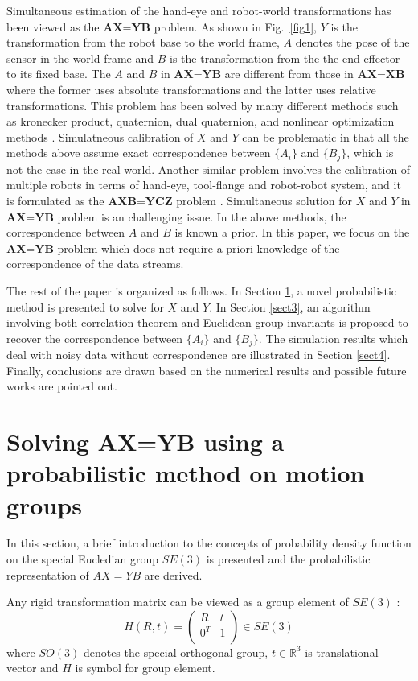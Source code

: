 \documentclass[letterpaper, 10 pt, conference]{ieeeconf}  %
\begin{document}
Simultaneous estimation of the hand-eye and robot-world transformations has been viewed as the $\textbf{AX=YB}$ problem. As shown in Fig.~\ref{fig1}, $Y$ is the transformation from the robot base to the world frame, $A$ denotes the pose of the sensor in the world frame and $B$ is the transformation from the the end-effector to its fixed base. The $A$ and $B$ in $\textbf{AX=YB}$ are different from those in $\textbf{AX=XB}$ where the former uses absolute transformations and the latter uses relative transformations. This problem has been solved by many different methods such as kronecker product, quaternion, dual quaternion, and nonlinear optimization methods \cite{Zhuang1994,dornaika1998simultaneous,Hirsh2001, ernst2012non,strobl2006optimal,Li2010,Shah2013,Heller2014}. Simulatneous calibration of $X$ and $Y$ can be problematic in that all the methods above assume exact correspondence between $\{A_i\}$ and $\{B_j\}$, which is not the case in the real world. Another similar problem involves the calibration of multiple robots in terms of hand-eye, tool-flange and robot-robot system, and it is formulated as the $\textbf{AXB=YCZ}$ problem \cite{Wang2014}. Simultaneous solution for $X$ and $Y$ in $\textbf{AX=YB}$ problem is an challenging issue. In the above methods, the correspondence between $A$ and $B$ is known a prior. In this paper, we focus on the $\textbf{AX=YB}$ problem which does not require a priori knowledge of the correspondence of the data streams.

The rest of the paper is organized as follows. In Section
\ref{sect2}, a novel probabilistic method is presented to solve for $X$ and $Y$. In Section \ref{sect3}, an algorithm involving both correlation theorem and Euclidean group invariants is proposed to recover the correspondence between $\{A_i\}$ and $\{B_j\}$. The simulation results which deal with noisy data without correspondence are illustrated in Section \ref{sect4}. Finally, conclusions are drawn based on the numerical results and possible future works are pointed out.

\section{Solving AX=YB using a probabilistic method on motion groups}
\label{sect2}
In this section, a brief introduction to the concepts of probability density function on the special Eucledian group $SE(3)$ is presented and the probabilistic representation of $AX=YB$ are derived.

Any rigid transformation matrix can be viewed as a group element of $SE(3)$ :
\begin{equation}\label{equ0}
    H(R,t)=\left(
             \begin{array}{cc}
               R & t \\
               0^{T} & 1 \\
             \end{array}
           \right) \in SE(3)
\end{equation}
where $SO(3)$ denotes the special orthogonal group, $t \in \mathbb{R}^3 $ is translational vector and $H$ is symbol for group element.
\end{document}
